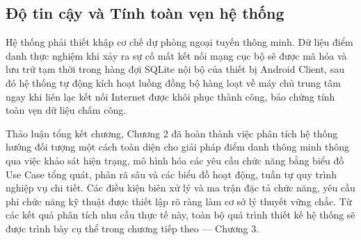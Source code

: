 \documentclass[../DoAn.tex]{subfiles}
\begin{document}
\subsection{Độ tin cậy và Tính toàn vẹn hệ thống}
Hệ thống phải thiết khập cơ chế dự phòng ngoại tuyến thông minh. Dữ liệu điểm danh thực nghiệm khi xảy ra sự cố mất kết nối mạng cục bộ sẽ được mã hóa và lưu trữ tạm thời trong hàng đợi SQLite nội bộ của thiết bị Android Client, sau đó hệ thống tự động kích hoạt luồng đồng bộ hàng loạt về máy chủ trung tâm ngay khi liên lạc kết nối Internet được khôi phục thành công, bảo chứng tính toàn vẹn dữ liệu chấm công.

Thảo luận tổng kết chương, Chương 2 đã hoàn thành việc phân tích hệ thống hướng đối tượng một cách toàn diện cho giải pháp điểm danh thông minh thông qua việc khảo sát hiện trạng, mô hình hóa các yêu cầu chức năng bằng biểu đồ Use Case tổng quát, phân rã sâu và các biểu đồ hoạt động, tuần tự quy trình nghiệp vụ chi tiết. Các điều kiện biên xử lý và ma trận đặc tả chức năng, yêu cầu phi chức năng kỹ thuật được thiết lập rõ ràng làm cơ sở lý thuyết vững chắc. Từ các kết quả phân tích nhu cầu thực tế này, toàn bộ quá trình thiết kế hệ thống sẽ được trình bày cụ thể trong chương tiếp theo — Chương 3.
\end{document}
